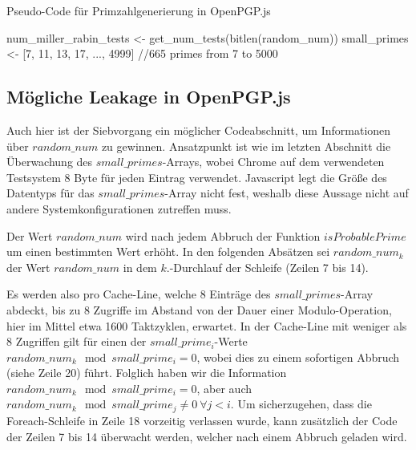 \begin{algorithm}[h]
\DontPrintSemicolon
\caption{Pseudo-Code für Primzahlgenerierung in OpenPGP.js}
\label{alg:randomProbablePrimeOpenPGPjs}
num_miller_rabin_tests <- get_num_tests(bitlen(random\_num))\;
small\_primes <- [7, 11, 13, 17, ..., 4999] //665 primes from 7 to 5000\;


\end{algorithm}

\subsection{Mögliche Leakage in OpenPGP.js}
\label{LeakageOpenPGPjs}

Auch hier ist der Siebvorgang ein möglicher Codeabschnitt, um Informationen über $random\_num$ zu gewinnen.
Ansatzpunkt ist wie im letzten Abschnitt die Überwachung des $small\_primes$-Arrays, wobei Chrome auf dem verwendeten Testsystem 8 Byte für jeden Eintrag verwendet. Javascript legt die Größe des Datentyps für das $small\_primes$-Array nicht fest, weshalb diese Aussage nicht auf andere Systemkonfigurationen zutreffen muss.

Der Wert $random\_num$ wird nach jedem Abbruch der Funktion $isProbablePrime$ um einen bestimmten Wert erhöht.
In den folgenden Absätzen sei $random\_num_k$ der Wert $random\_num$ in dem $k.$-Durchlauf der Schleife (Zeilen 7 bis 14).

Es werden also pro Cache-Line, welche 8 Einträge des $small\_primes$-Array abdeckt, bis zu 8 Zugriffe im Abstand von der Dauer einer Modulo-Operation, hier im Mittel etwa 1600 Taktzyklen, erwartet.
In der Cache-Line mit weniger als 8 Zugriffen gilt für einen der $small\_prime_i$-Werte $random\_num_k \mod small\_prime_i = 0$, wobei dies zu einem sofortigen Abbruch (siehe Zeile 20) führt.
Folglich haben wir die Information $random\_num_k \mod small\_prime_i = 0$, aber auch $random\_num_k \mod small\_prime_j \neq 0 \: \forall j < i$.
Um sicherzugehen, dass die Foreach-Schleife in Zeile 18 vorzeitig verlassen wurde, kann zusätzlich der Code der Zeilen 7 bis 14 überwacht werden, welcher nach einem Abbruch geladen wird.

